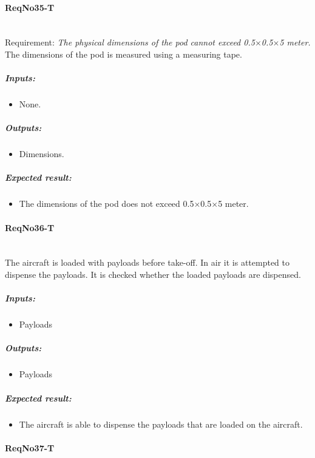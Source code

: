 \paragraph{ReqNo35-T}\mbox{}\\ %
Requirement: \textit{The physical dimensions of the pod cannot exceed 0.5$\times$0.5$\times$5 meter.}
\\
The dimensions of the pod is measured using a measuring tape.

	\subparagraph{Inputs:}
	\begin{itemize}
	\item None.
	\end{itemize}
	\subparagraph{Outputs:}
	\begin{itemize}
	\item Dimensions.
	\end{itemize}
	\subparagraph{Expected result:}
	\begin{itemize}
	\item The dimensions of the pod does not exceed 0.5$\times$0.5$\times$5 meter.
	\end{itemize}


\paragraph{ReqNo36-T}\mbox{}\\ %
The aircraft is loaded with payloads before take-off. In air it is attempted to dispense the payloads. It is checked whether the loaded payloads are dispensed.
\\
	\subparagraph{Inputs:}
	\begin{itemize}
	\item Payloads
	\end{itemize}
	\subparagraph{Outputs:}
	\begin{itemize}
	\item Payloads
	\end{itemize}
	\subparagraph{Expected result:}
	\begin{itemize}
	\item The aircraft is able to dispense the payloads that are loaded on the aircraft.
	\end{itemize}


\paragraph{ReqNo37-T}\mbox{}\\ %


